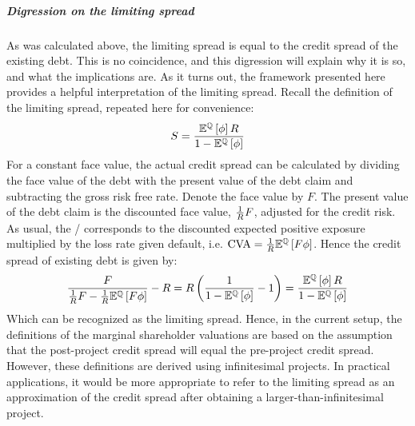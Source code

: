 \documentclass[main.tex]{subfiles}
\begin{document}
    \subparagraph{Digression on the limiting spread}
    As was calculated above, the limiting spread is equal to the credit spread of the existing debt.
    This is no coincidence, and this digression will explain why it is so,
    and what the implications are.
    As it turns out, 
    the framework presented here provides a helpful interpretation of the limiting spread.
    Recall the definition of the limiting spread, repeated here for convenience:
        \begin{equation*}
            S
            =
            \frac{
                \mathbb{E}^{\mathbb{Q}}\left[\phi\right]
                R
            }{
                1
                -
                \mathbb{E}^{\mathbb{Q}}\left[\phi\right]
            }
        \end{equation*}
    For a constant face value,
    the actual credit spread can be calculated by dividing the face value of the debt
    with the present value of the debt claim and subtracting the gross risk free rate.
    Denote the face value by $F$. 
    The present value of the debt claim is the discounted face value, $\frac{1}{R} F$,
    adjusted for the credit risk. 
    As usual, the \CVA/ corresponds to the discounted expected positive exposure
    multiplied by the loss rate given default, 
    i.e. $\CVA/ = \discountfactor\mathbb{E}^{\rnmeasure}\left[F \phi \right] $.
    Hence the credit spread of existing debt is given by:
        \begin{equation*}
            \frac{
                F
            }{
                \frac{1}{R} F
                -
                \frac{1}{R}
                \mathbb{E}^{\mathbb{Q}}\left[
                    F \phi
                \right] 
            } 
            -
            R
            =
            R \left(
            \frac{
                1
            }{
                    1
                    -
                    \mathbb{E}^{\mathbb{Q}}\left[
                        \phi
                    \right] 
            } 
            - 
            1
            \right)
            =
            \frac{
                \mathbb{E}^{\mathbb{Q}}\left[\phi\right]
                R
            }{
                1
                -
                \mathbb{E}^{\mathbb{Q}}\left[\phi\right]
            }
        \end{equation*}
        Which can be recognized as the limiting spread. 
        Hence, in the current setup, 
        the definitions of the marginal shareholder valuations are based on
        the assumption that the post-project credit spread 
        will equal the pre-project credit spread.
        However, these definitions are derived using infinitesimal projects. 
        In practical applications,
        it would be more appropriate to refer to the limiting spread as an approximation 
        of the credit spread after obtaining a larger-than-infinitesimal project.
        
\end{document}
